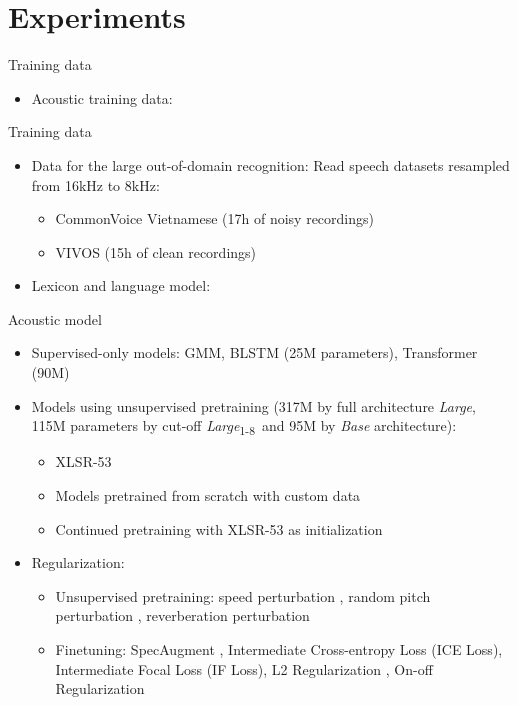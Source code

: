 \section{Experiments}

\begin{frame}{Training data}
\begin{itemize}
    \item Acoustic training data: %
\end{itemize}


\end{frame}

\begin{frame}{Training data}
\begin{itemize}
    \item Data for the large out-of-domain recognition: Read speech datasets resampled from 16kHz to 8kHz: 
    \begin{itemize}
        \item CommonVoice Vietnamese (17h of noisy recordings) \cite{ardila2020commonvoice}
        \item VIVOS (15h of clean recordings) \cite{vivos_dataset}
    \end{itemize}
    \item Lexicon and language model:
\end{itemize}
 
\end{frame}

\begin{frame}{Acoustic model}
\begin{itemize}
    \item Supervised-only models: GMM, BLSTM (25M parameters), Transformer (90M)
    
    \item Models using unsupervised pretraining (317M by full architecture \textit{Large}, 115M parameters by cut-off \textit{Large}\textsubscript{1-8}\xspace \, and 95M by \textit{Base} architecture): 
    \begin{itemize}
        \item XLSR-53
        \item Models pretrained from scratch with custom data
        \item Continued pretraining with XLSR-53 as initialization
    \end{itemize}
    
    \item Regularization: 
    \begin{itemize}
        \item Unsupervised pretraining: 
        speed perturbation \cite{speed_perturbation}, random pitch perturbation \cite{pitch_perturbation}, reverberation perturbation \cite{reverb_perturbation}
        \item Finetuning: SpecAugment \cite{park2019specaugment}, Intermediate Cross-entropy Loss (ICE Loss), Intermediate Focal Loss (IF Loss), L2 Regularization \cite{L2_regularization}, On-off Regularization
    \end{itemize}
\end{itemize}
\end{frame}